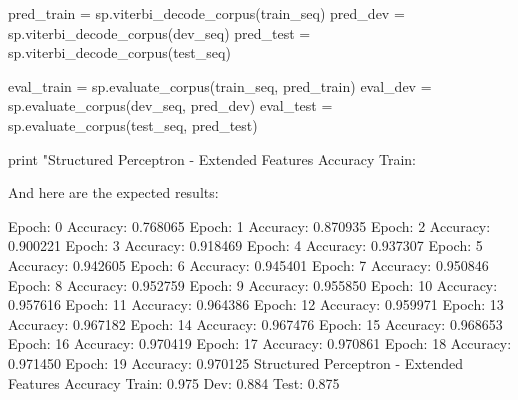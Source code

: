 \begin{exercise}
\begin{python}
pred_train = sp.viterbi_decode_corpus(train_seq)
pred_dev = sp.viterbi_decode_corpus(dev_seq)
pred_test = sp.viterbi_decode_corpus(test_seq)

eval_train = sp.evaluate_corpus(train_seq, pred_train)
eval_dev = sp.evaluate_corpus(dev_seq, pred_dev)
eval_test = sp.evaluate_corpus(test_seq, pred_test)

print "Structured Perceptron - Extended Features Accuracy Train: %
\end{python}

And here are the expected results:
\begin{python}
Epoch: 0 Accuracy: 0.768065
Epoch: 1 Accuracy: 0.870935
Epoch: 2 Accuracy: 0.900221
Epoch: 3 Accuracy: 0.918469
Epoch: 4 Accuracy: 0.937307
Epoch: 5 Accuracy: 0.942605
Epoch: 6 Accuracy: 0.945401
Epoch: 7 Accuracy: 0.950846
Epoch: 8 Accuracy: 0.952759
Epoch: 9 Accuracy: 0.955850
Epoch: 10 Accuracy: 0.957616
Epoch: 11 Accuracy: 0.964386
Epoch: 12 Accuracy: 0.959971
Epoch: 13 Accuracy: 0.967182
Epoch: 14 Accuracy: 0.967476
Epoch: 15 Accuracy: 0.968653
Epoch: 16 Accuracy: 0.970419
Epoch: 17 Accuracy: 0.970861
Epoch: 18 Accuracy: 0.971450
Epoch: 19 Accuracy: 0.970125
Structured Perceptron - Extended Features Accuracy Train: 0.975 Dev: 0.884 Test: 0.875
\end{python}

\end{exercise}





